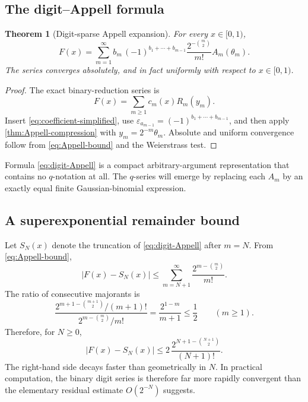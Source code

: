 \documentclass[11pt,oneside]{article}
\newtheorem{theorem}{Theorem}[section]
\theoremstyle{definition}
\theoremstyle{remark}
\newcommand{\eps}{\varepsilon}
\begin{document}
\subsection{The digit--Appell formula}

\begin{theorem}[Digit-sparse Appell expansion]\label{thm:digit-Appell}
For every $x\in[0,1)$,
\begin{equation}\label{eq:digit-Appell}
 \boxed{
 F(x)=
 \sum_{m=1}^{\infty}
 b_m\,(-1)^{b_1+\cdots+b_{m-1}}
 \frac{2^{-\binom m2}}{m!}
 A_m(\theta_m).}
\end{equation}
The series converges absolutely, and in fact uniformly with respect to
$x\in[0,1)$.
\end{theorem}

\begin{proof}
The exact binary-reduction series is
\[
 F(x)=\sum_{m\ge1}c_m(x)R_m(y_m).
\]
Insert \eqref{eq:coefficient-simplified}, use
$\eps_{a_{m-1}}=(-1)^{b_1+\cdots+b_{m-1}}$, and then apply
\cref{thm:Appell-compression} with $y_m=2^{-m}\theta_m$.
Absolute and uniform convergence follow from
\eqref{eq:Appell-bound} and the Weierstrass test.
\end{proof}

Formula \eqref{eq:digit-Appell} is a compact arbitrary-argument representation
that contains no $q$-notation at all.  The $q$-series will emerge by replacing
each $A_m$ by an exactly equal finite Gaussian-binomial expression.

\subsection{A superexponential remainder bound}

Let $S_N(x)$ denote the truncation of \eqref{eq:digit-Appell} after $m=N$.
From \eqref{eq:Appell-bound},
\[
 |F(x)-S_N(x)|
 \le\sum_{m=N+1}^{\infty}\frac{2^{m-\binom m2}}{m!}.
\]
The ratio of consecutive majorants is
\[
 \frac{2^{m+1-\binom{m+1}{2}}/(m+1)!}
      {2^{m-\binom m2}/m!}
 =\frac{2^{1-m}}{m+1}\le\frac12
 \qquad(m\ge1).
\]
Therefore, for $N\ge0$,
\begin{equation}\label{eq:digit-tail-bound}
 \boxed{
  |F(x)-S_N(x)|
  \le 2\,\frac{2^{N+1-\binom{N+1}{2}}}{(N+1)!}.}
\end{equation}
The right-hand side decays faster than geometrically in $N$.  In practical
computation, the binary digit series is therefore far more rapidly convergent
than the elementary residual estimate $O(2^{-N})$ suggests.
\end{document}
